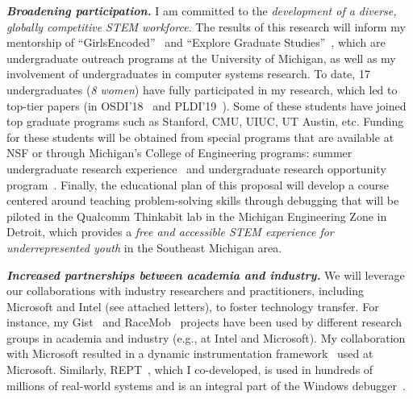 \noindent \textit{\textbf{Broadening participation.}} I am committed to the \textit{development of a diverse, globally competitive STEM workforce}. The results of this research will inform my mentorship of “GirlsEncoded”~\cite{girlsencoded} and “Explore Graduate Studies”~\cite{ExploreG5:online}, which are undergraduate outreach programs at the University of Michigan, as well as my involvement of undergraduates in computer systems research. To date, 17 undergraduates (\textit{8 women}) have fully participated in my research, which led to top-tier papers (in OSDI'18~\cite{rept} and PLDI'19~\cite{huron}). Some of these students have joined top graduate programs such as Stanford, CMU, UIUC, UT Austin, etc. Funding for these students will be obtained from special programs that are available at NSF or through Michigan's College of Engineering programs: summer undergraduate research experience~\cite{sure} and undergraduate research opportunity program~\cite{urop}. Finally, the educational plan of this proposal will develop a course centered around teaching problem-solving skills through debugging that will be piloted in the Qualcomm Thinkabit lab in the Michigan Engineering Zone in Detroit, which provides a \textit{free and accessible STEM experience for underrepresented youth} in the Southeast Michigan area.

\noindent \textit{\textbf{Increased partnerships between academia and industry.}} We will leverage our collaborations with industry researchers and practitioners, including Microsoft and Intel (see attached letters), to foster technology transfer. For instance, my Gist~\cite{gist} and RaceMob~\cite{racemob} projects have been used by different research groups in academia and industry (e.g., at Intel and Microsoft). My collaboration with Microsoft resulted in a dynamic instrumentation framework~\cite{bfs} used at Microsoft. Similarly, REPT~\cite{rept}, which I co-developed, is used in hundreds of millions of real-world systems and is an integral part of the Windows debugger~\cite{windbg}. 
